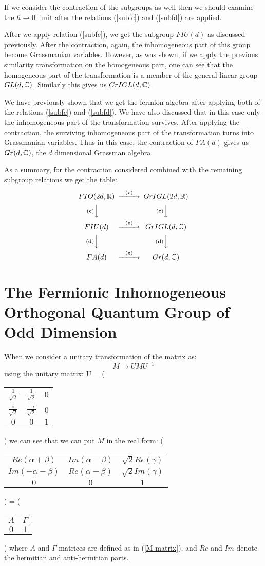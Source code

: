 If we consider the contraction of the subgroups as well then we
should examine the $\hbar \rightarrow 0$ limit after the relations
(\ref{subfc}) and (\ref{subfd}) are applied.

After we apply relation (\ref{subfc}), we get the subgroup $FIU(d)$
as discussed previously. After the contraction,
again, the inhomogeneous part of this group become
Grassmanian variables. However, as was shown, if we apply the previous similarity
transformation on the homogeneous part, one can see that the
homogeneous part of the transformation is a member of the general 
linear group $GL(d, \mathbb{C})$. Similarly this gives us $GrIGL(d, \mathbb{C})$.

We have previously shown that we get the fermion
algebra after applying both of the relations (\ref{subfc}) and
(\ref{subfd}). We have also discussed that in this case only the
inhomogeneous part of the transformation survives. After
applying the contraction, the surviving inhomogeneous part of the
transformation turns into Grassmanian variables. Thus
in this case, the contraction of $FA(d)$ gives us $Gr(d, \mathbb{C})$, 
the $d$ dimensional Grassman algebra.

As a summary, for the contraction considered combined with the
remaining subgroup relations we get the table:
\[
\begin{CD}
{FIO(2d, \IR)} @>{\bf (e)}>> {GrIGL(2d, \IR)} \\
@V{\bf (c)}VV @V{\bf (c)}VV \\
{FIU(d)} @>{\bf (e)}>> {GrIGL(d, \IC)} \\
@V{\bf (d)}VV @V{\bf (d)}VV \\
{FA(d)} @>{\bf (e)}>> {Gr(d, \IC)}
\end{CD}
\]

\section{The Fermionic Inhomogeneous
Orthogonal Quantum Group of Odd Dimension}

When we consider a unitary transformation of the \FIO matrix as:
\[
M \rightarrow UMU^{-1}
\]
using the unitary matrix: \beq U = \left(
\begin{tabular}{cc|c}
$\frac{1}{\sqrt{2}}$ & $\frac{1}{\sqrt{2}}$ & $0$ \\
$\frac{i}{\sqrt{2}}$ & $\frac{-i}{\sqrt{2}}$ & $0$ \\
\hline $0$ & $0$ & $1$
\end{tabular}
\right) \eeq we can see that we can put $M$ in the real form: \beq
\left(
\begin{tabular}{cc|c}
$Re(\alpha + \beta)$ & $Im(\alpha - \beta)$ & $\sqrt{2}Re(\gamma)$ \\
$Im(-\alpha - \beta)$ & $Re(\alpha - \beta)$ & $\sqrt{2}Im(\gamma)$ \\
\hline $0$ & $0$ & $1$
\end{tabular}
\right) = \left(
\begin{tabular}{c|c}
$A$ & $\Gamma$ \\
\hline $0$ & $1$
\end{tabular}
\right) \eeq where $A$ and $\Gamma$ matrices are defined as in
(\ref{M-matrix}), and $Re$ and $Im$ denote the hermitian and
anti-hermitian parts.

